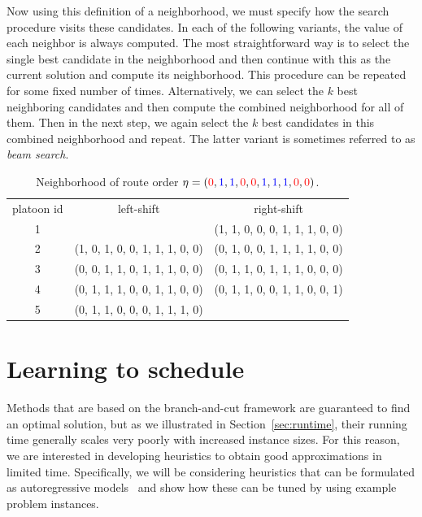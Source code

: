 \documentclass[a4paper]{article}
\theoremstyle{definition}
\theoremstyle{plain}
\begin{document}
Now using this definition of a neighborhood, we must specify how the search
procedure visits these candidates.
In each of the following variants, the value of each neighbor is always computed.
%
The most straightforward way is to select the single best candidate in the
neighborhood and then continue with this as the current solution and compute its
neighborhood. This procedure can be repeated for some fixed number of times.
Alternatively, we can select the $k$ best neighboring candidates and then
compute the combined neighborhood for all of them. Then in the next step, we
again select the $k$ best candidates in this combined neighborhood and repeat.
The latter variant is sometimes referred to as \textit{beam search}.

\newcommand*{\1}{{\color{blue}1}}%
\newcommand*{\0}{{\color{red}0}}%

\begin{table}
\caption{Neighborhood of route order $\eta = (\0, \1, \1, \0, \0, \1, \1, \1, \0, \0)$.}
\label{tab:local_search}
\begin{center}
\begin{tabular}{c|c|c}
  platoon id  & left-shift & right-shift \\
  1 &  & (\1, \1, \0, \0, \0, \1, \1, \1, \0, \0) \\
  2 & (\1, \0, \1, \0, \0, \1, \1, \1, \0, \0) & (\0, \1, \0, \0, \1, \1, \1, \1, \0, \0) \\
  3 & (\0, \0, \1, \1, \0, \1, \1, \1, \0, \0) & (\0, \1, \1, \0, \1, \1, \1, \0, \0, \0) \\
  4 & (\0, \1, \1, \1, \0, \0, \1, \1, \0, \0) & (\0, \1, \1, \0, \0, \1, \1, \0, \0, \1) \\
  5 & (\0, \1, \1, \0, \0, \0, \1, \1, \1, \0) &
\end{tabular}
\end{center}
\end{table}

\section{Learning to schedule}

Methods that are based on the branch-and-cut framework are guaranteed to find an
optimal solution, but as we illustrated in Section~\ref{sec:runtime}, their running time
generally scales very poorly with increased instance sizes. For this reason, we
are interested in developing heuristics to obtain good approximations in limited
time.
%
Specifically, we will be considering heuristics that can be formulated as
autoregressive models~\cite{tomczakDeepGenerativeModeling2024} and show how these can be tuned by using example
problem instances.
\end{document}
